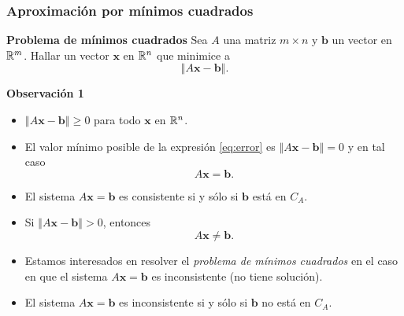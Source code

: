 {\nologo
\begin{frame}\frametitle{Aproximación por mínimos cuadrados}
		
	\begin{ejem}{\textbf{Problema de mínimos cuadrados}}
		\justifying
		Sea $A$ una matriz $m\times n$ y $\mathbf{b}$ un vector en $\mathbb{R}^m$. Hallar un vector $\mathbf{x}$ en $\mathbb{R}^n$
		que minimice a
		\begin{equation}\label{eq:error}
			\left\Vert A\mathbf{x} - \mathbf{b} \right\Vert. 
		\end{equation}					
	\end{ejem}

	\begin{alertblock}{\textbf{Observación 1}}
		\begin{itemize}
			\item[\labelname{$a$}] $\left\Vert A\mathbf{x} - \mathbf{b} \right\Vert \geq 0 $ para todo $\mathbf{x}$ en $\mathbb{R}^n$.
			\item[\labelname{$b$}] El valor mínimo posible de la expresión \eqref{eq:error} es 
			$\left\Vert A\mathbf{x} - \mathbf{b} \right\Vert = 0 $ y en tal caso
			\[
				A\mathbf{x} = \mathbf{b}.
			\]
			\item[\labelname{$c$}] El sistema $A\mathbf{x} = \mathbf{b}$ es consistente si y sólo si $\mathbf{b}$ está en $C_A$.
			\item[\labelname{$d$}] Si $\left\Vert A\mathbf{x} - \mathbf{b} \right\Vert > 0 $, entonces
			\[
				A\mathbf{x} \neq \mathbf{b}.
			\]
			\item[\labelname{$e$}] Estamos interesados en resolver el \textit{problema de mínimos cuadrados} 
			en el caso en que el sistema $A\mathbf{x} = \mathbf{b}$ es inconsistente (no tiene solución).
			\item[\labelname{$f$}] El sistema $A\mathbf{x} = \mathbf{b}$ es inconsistente si y sólo si 
			$\mathbf{b}$ no está en $C_A$.
		\end{itemize}
	\end{alertblock}
	
\end{frame}
}


\subsection{}

